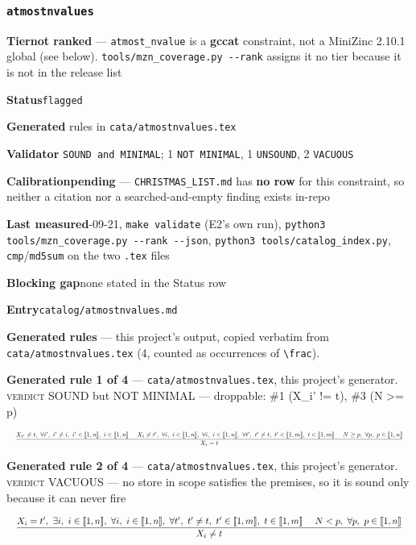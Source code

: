 \documentclass[10pt,a4paper]{article}
\newcommand{\entryfield}[2]{{\raggedright\textbf{#1}\quad #2\par}}
\newcommand{\rulebox}[1]{%
  \[\resizebox{\ifdim\width>\linewidth\linewidth\else\width\fi}{!}%
    {$\displaystyle #1$}\]}
\begin{document}
\subsubsection*{\texttt{atmostnvalues}}
\label{entry:atmostnvalues}
\entryfield{Tier}{\textbf{not ranked} --- \texttt{atmost\_nvalue} is a \textbf{gccat} constraint, not a MiniZinc 2.10.1 global (see below). \texttt{tools/\allowbreak{}mzn\_\allowbreak{}coverage.\allowbreak{}py -\allowbreak{}-\allowbreak{}rank} assigns it no tier because it is not in the release list}
\entryfield{Status}{\texttt{flagged}}
\entryfield{Generated}{4 rules in \texttt{cata/atmostnvalues.tex}}
\entryfield{Validator}{0 \texttt{SOUND and MINIMAL}; 1 \texttt{NOT MINIMAL}, 1 \texttt{UNSOUND}, 2 \texttt{VACUOUS}}
\entryfield{Calibration}{\textbf{pending} --- \texttt{CHRISTMAS\_LIST.md} has \textbf{no row} for this constraint, so neither a citation nor a searched-and-empty finding exists in-repo}
\entryfield{Last measured}{2026-09-21, \texttt{make validate} (E2's own run), \texttt{python3 tools/\allowbreak{}mzn\_\allowbreak{}coverage.\allowbreak{}py -\allowbreak{}-\allowbreak{}rank -\allowbreak{}-\allowbreak{}json}, \texttt{python3 tools/\allowbreak{}catalog\_\allowbreak{}index.\allowbreak{}py}, \texttt{cmp}/\texttt{md5sum} on the two \texttt{.tex} files}
\entryfield{Blocking gap}{none stated in the Status row}
\entryfield{Entry}{\texttt{catalog/atmostnvalues.md}}

\textbf{Generated rules} --- this project's output, copied verbatim from \texttt{cata/atmostnvalues.tex} (4, counted as occurrences of \texttt{\textbackslash{}frac}).\par

{\small\textbf{Generated rule 1 of 4} --- \texttt{cata/atmostnvalues.tex}, this project's generator. \textsc{verdict} SOUND but NOT MINIMAL --- droppable: \#1 (X\_i' != t), \#3 (N >= p)\par}
\rulebox{\frac{X_{i'} \neq t,~\forall i',~i' \neq i,~i' \in \llbracket1,n\rrbracket,~i \in \llbracket1,n\rrbracket~~~~X_{i} \neq t',~\forall i,~i \in \llbracket1,n\rrbracket,~\forall i,~i \in \llbracket1,n\rrbracket,~\forall t',~t' \neq t,~t' \in \llbracket1,m\rrbracket,~t \in \llbracket1,m\rrbracket~~~~N \geq p,~\forall p,~p \in \llbracket1,n\rrbracket}{X_{i}=t}}

{\small\textbf{Generated rule 2 of 4} --- \texttt{cata/atmostnvalues.tex}, this project's generator. \textsc{verdict} VACUOUS --- no store in scope satisfies the premises, so it is sound only because it can never fire\par}
\rulebox{\frac{X_{i}=t',~\exists i,~i \in \llbracket1,n\rrbracket,~\forall i,~i \in \llbracket1,n\rrbracket,~\forall t',~t' \neq t,~t' \in \llbracket1,m\rrbracket,~t \in \llbracket1,m\rrbracket~~~~N<p,~\forall p,~p \in \llbracket1,n\rrbracket}{X_{i} \neq t}}
\end{document}
